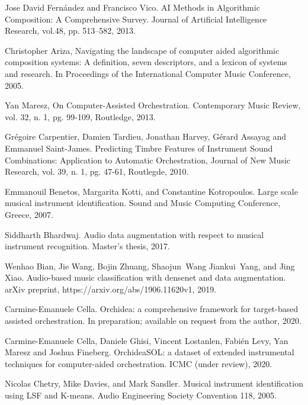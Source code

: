 \documentclass{article}
\begin{document}
\begin{thebibliography}{99}

 Jose David Fern\'andez and Francisco Vico. {AI Methods in Algorithmic Composition: A Comprehensive Survey}. Journal of Artificial Intelligence Research, vol.48, pp. 513--582, 2013.

 Christopher Ariza, {Navigating the landscape of computer aided algorithmic composition systems: A definition, seven descriptors, and a lexicon of systems and research}. In Proceedings of the International Computer Music Conference, 2005.

Yan Maresz, {On Computer-Assisted Orchestration}. Contemporary Music Review, vol. 32, n. 1, pg. 99-109, Routledge, 2013.

Gr\'egoire Carpentier, Damien Tardieu, Jonathan Harvey, G\'erard Assayag and Emmanuel Saint-James. {Predicting Timbre Features of Instrument Sound Combinations: Application to Automatic Orchestration}, Journal of New Music Research, vol. 39, n. 1, pg. 47-61, Routlegde, 2010.


Emmanouil Benetos, Margarita Kotti, and Constantine Kotropoulos.
\newblock Large scale musical instrument identification.
\newblock Sound and Music Computing Conference, Greece, 2007.

Siddharth Bhardwaj.
\newblock Audio data augmentation with respect to musical instrument
  recognition.
\newblock Master's thesis, 2017.

Wenhao Bian, Jie Wang, Bojin Zhuang, Shaojun~Wang Jiankui~Yang, and Jing Xiao.
\newblock Audio-based music classification with densenet and data augmentation.
\newblock arXiv preprint, https://arxiv.org/abs/1906.11620v1, 2019.

Carmine-Emanuele Cella.
\newblock Orchidea: a comprehensive framework for target-based assisted orchestration.
\newblock In preparation; available on request from the author, 2020.

Carmine-Emanuele Cella, Daniele Ghisi, Vincent Lostanlen, Fabi\'en Levy, Yan Maresz and Joshua Fineberg.
\newblock OrchideaSOL: a dataset of extended instrumental techniques for computer-aided orchestration.
\newblock ICMC (under review), 2020.

Nicolas Chetry, Mike Davies, and Mark Sandler.
\newblock Musical instrument identification using LSF and K-means.
\newblock Audio Engineering Society Convention 118, 2005.


\end{thebibliography}
\end{document}
